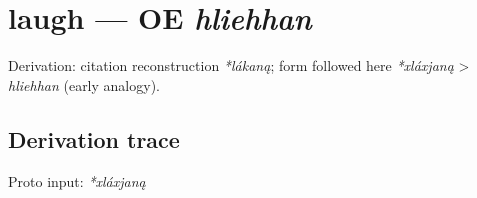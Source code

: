 \documentclass[
  british,
  a4paper,
  openany]{book}
\providecommand{\texorpdfstring}[2]{#1}
\begin{document}
\section{\texorpdfstring{laugh --- OE
\emph{hliehhan}}{laugh --- OE hliehhan}}\label{laugh-oe-hliehhan}


Derivation: citation reconstruction \emph{*lákaną}; form followed here
\emph{*xláxjaną} \textgreater{} \emph{hliehhan} (early analogy).

\subsection{Derivation trace}\label{derivation-trace-86}

Proto input: \emph{*xláxjaną}

\begingroup
\setlength{\fboxsep}{6pt}
\end{document}
